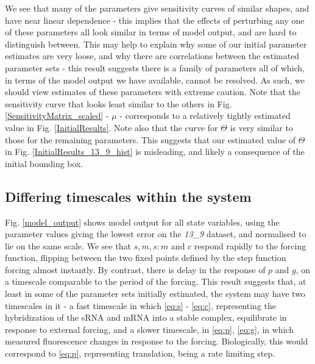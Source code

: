 \documentclass[10pt,journal]{./IEEE_latex_class/IEEEtran}
\begin{document}
We see that many of the parameters give sensitivity curves of similar shapes, and have near linear dependence - this implies that the effects of perturbing any one of these parameters all look similar in terms of model output, and are hard to distinguish between. This may help to explain why some of our initial parameter estimates are very loose, and why there are correlations between the estimated parameter sets - this result suggests there is a family of parameters all of which, in terms of the model output we have available, cannot be resolved. As such, we should view estimates of these parameters with extreme caution. Note that the sensitivity curve that looks least similar to the others in Fig. \ref{SensitivityMatrix_scaled} - $\mu$ - corresponds to a relatively tightly estimated value in Fig. \ref{InitialResults}. Note also that the curve for $\Theta$ is very similar to those for the remaining parameters. This suggests that our estimated value of $\Theta$ in Fig. \ref{InitialResults_13_9_hist} is misleading, and likely a consequence of the initial bounding box.

\subsection{Differing timescales within the system}

Fig. \ref{model_output} shows model output for all state variables, using the parameter values giving the lowest error on the \textit{13\_9} dataset, and normalised to lie on the same scale. We see that $s,m,s:m$ and $c$ respond rapidly to the forcing function, flipping between the two fixed points defined by the step function forcing almost instantly. By contrast, there is delay in the response of $p$ and $g$, on a timescale comparable to the period of the forcing. This result suggests that, at least in some of the parameter sets initially estimated, the system may have two timescales in it - a fast timescale in which \eqref{eq:s} - \eqref{eq:c}, representing the hybridization of the sRNA and mRNA into a stable complex, equilibrate in response to external forcing, and a slower timescale, in \eqref{eq:p}, \eqref{eq:g}, in which measured fluorescence changes in response to the forcing. Biologically, this would correspond to \eqref{eq:p}, representing translation, being a rate limiting step.
\end{document}
